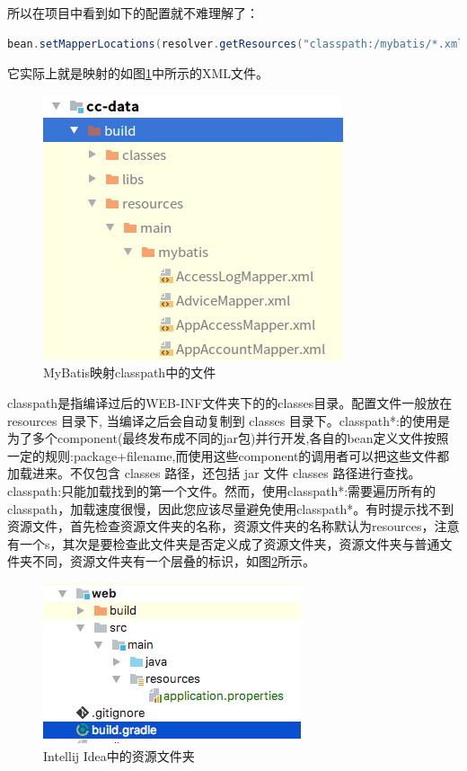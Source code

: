 \documentclass[12pt]{book}
\numberwithin{dummy}{section}
\theoremstyle{ocrenumbox}
\theoremstyle{blacknumex}
\theoremstyle{blacknumbox}
\theoremstyle{ocrenum}
\begin{document}
所以在项目中看到如下的配置就不难理解了：

\begin{lstlisting}[language=Java]
bean.setMapperLocations(resolver.getResources("classpath:/mybatis/*.xml"));
\end{lstlisting}
它实际上就是映射的如图\ref{fig:classpathfile}中所示的XML文件。

\begin{figure}[tbph]
	\centering
	\includegraphics[scale=0.7]{classpathfile}
	\caption{MyBatis映射classpath中的文件}
	\label{fig:classpathfile}
\end{figure}

classpath是指编译过后的WEB-INF文件夹下的的classes目录。配置文件一般放在 resources 目录下, 当编译之后会自动复制到 classes 目录下。classpath*:的使用是为了多个component(最终发布成不同的jar包)并行开发,各自的bean定义文件按照一定的规则:package+filename,而使用这些component的调用者可以把这些文件都加载进来。不仅包含 classes 路径，还包括 jar 文件 classes 路径进行查找。classpath:只能加载找到的第一个文件。然而，使用classpath*:需要遍历所有的classpath，加载速度很慢，因此您应该尽量避免使用classpath*。有时提示找不到资源文件，首先检查资源文件夹的名称，资源文件夹的名称默认为resources，注意有一个s，其次是要检查此文件夹是否定义成了资源文件夹，资源文件夹与普通文件夹不同，资源文件夹有一个层叠的标识，如图\ref{fig:javaresourcefolder}所示。

\begin{figure}[htbp]
	\centering
	\includegraphics[scale=0.8]{javaresourcefolder.png}
	\caption{Intellij Idea中的资源文件夹}
	\label{fig:javaresourcefolder}
\end{figure}
\end{document}
